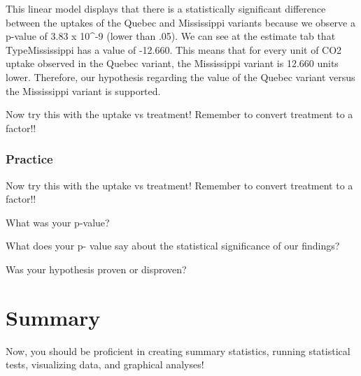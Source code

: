 \documentclass[
]{article}
\begin{document}
This linear model displays that there is a statistically significant
difference between the uptakes of the Quebec and Mississippi variants
because we observe a p-value of 3.83 x 10\^{}-9 (lower than .05). We can
see at the estimate tab that TypeMississippi has a value of -12.660.
This means that for every unit of CO2 uptake observed in the Quebec
variant, the Mississippi variant is 12.660 units lower. Therefore, our
hypothesis regarding the value of the Quebec variant versus the
Mississippi variant is supported.

Now try this with the uptake vs treatment! Remember to convert treatment
to a factor!!

\subsubsection{Practice}\label{practice-4}

Now try this with the uptake vs treatment! Remember to convert treatment
to a factor!!

What was your p-value?

What does your p- value say about the statistical significance of our
findings?

Was your hypothesis proven or disproven?

\section{Summary}\label{summary}

Now, you should be proficient in creating summary statistics, running
statistical tests, visualizing data, and graphical analyses!
\end{document}
